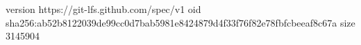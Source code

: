 version https://git-lfs.github.com/spec/v1
oid sha256:ab52b8122039de99cc0d7bab5981e8424879d4f33f76f82e78fbfcbeeaf8c67a
size 3145904
